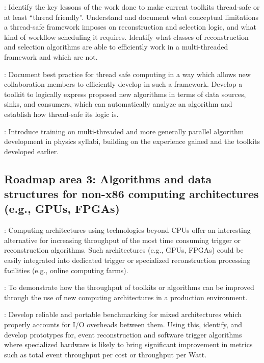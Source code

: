 \vskip 0.5cm
: Identify the key lessons of the work done to make current toolkits thread-safe or at least “thread friendly”. Understand and document what conceptual limitations a thread-safe framework imposes on reconstruction and selection logic, and what kind of workflow scheduling it requires. Identify what classes of reconstruction and selection algorithms are able to efficiently work in a multi-threaded framework and which are not. 

\vskip 0.5cm
: Document best practice for thread safe computing in a way which allows new collaboration members to efficiently develop in such a framework. Develop a toolkit to logically express proposed new algorithms in terms of data sources, sinks, and consumers, which can automatically analyze an algorithm and establish how thread-safe its logic is.

\vskip 0.5cm
: Introduce training on multi-threaded and more generally parallel algorithm development in physics syllabi, building on the experience gained and the toolkits developed earlier.

\subsection{Roadmap area 3: Algorithms and data structures for non-x86 computing architectures (e.g., GPUs, FPGAs)}
: Computing architectures using technologies beyond CPUs offer an interesting alternative for increasing throughput of the most time consuming trigger or reconstruction algorithms. Such architectures (e.g., GPUs, FPGAs) could be easily integrated into dedicated trigger or specialized reconstruction processing facilities (e.g., online computing farms).

\vskip 0.5cm
: To demonstrate how the throughput of toolkits or algorithms can be improved through the use of new computing architectures in a production environment. 

\vskip 0.5cm
: Develop reliable and portable benchmarking for mixed architectures which properly accounts for I/O overheads between them. Using this, identify, and develop prototypes for, event reconstruction and software trigger algorithms where specialized hardware is likely to bring significant improvement in metrics such as total event throughput per cost or throughput per Watt. 

